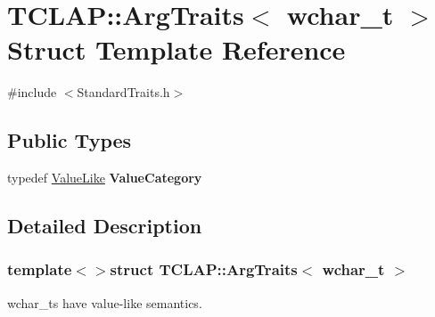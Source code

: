 \hypertarget{struct_t_c_l_a_p_1_1_arg_traits_3_01wchar__t_01_4}{\section{T\-C\-L\-A\-P\-:\-:Arg\-Traits$<$ wchar\-\_\-t $>$ Struct Template Reference}
\label{struct_t_c_l_a_p_1_1_arg_traits_3_01wchar__t_01_4}
}


{\ttfamily \#include $<$Standard\-Traits.\-h$>$}

\subsection*{Public Types}
\begin{DoxyCompactItemize}
\item 
\hypertarget{struct_t_c_l_a_p_1_1_arg_traits_3_01wchar__t_01_4_a49a311297a394637af4d8d64eda7f442}{typedef \hyperlink{struct_t_c_l_a_p_1_1_value_like}{Value\-Like} {\bfseries Value\-Category}}\label{struct_t_c_l_a_p_1_1_arg_traits_3_01wchar__t_01_4_a49a311297a394637af4d8d64eda7f442}

\end{DoxyCompactItemize}


\subsection{Detailed Description}
\subsubsection*{template$<$$>$struct T\-C\-L\-A\-P\-::\-Arg\-Traits$<$ wchar\-\_\-t $>$}

wchar\-\_\-ts have value-\/like semantics. 